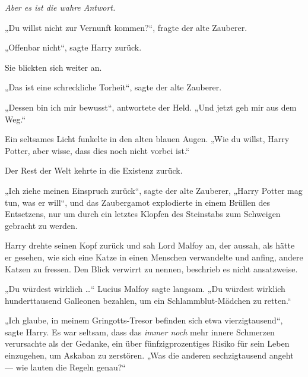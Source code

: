 \emph{Aber es ist die wahre Antwort.}

„Du willst nicht zur Vernunft kommen?“, fragte der alte Zauberer.

„Offenbar nicht“, sagte Harry zurück.

Sie blickten sich weiter an.

„Das ist eine schreckliche Torheit“, sagte der alte Zauberer.

„Dessen bin ich mir bewusst“, antwortete der Held.
„Und jetzt geh mir aus dem Weg.“

Ein seltsames Licht funkelte in den alten blauen Augen.
„Wie du willst, Harry Potter, aber wisse, dass dies noch nicht vorbei ist.“

Der Rest der Welt kehrte in die Existenz zurück.

„Ich ziehe meinen Einspruch zurück“, sagte der alte Zauberer,
„Harry Potter mag tun, was er will“, und das Zaubergamot explodierte in einem Brüllen des Entsetzens, nur um durch ein letztes Klopfen des Steinstabs zum Schweigen gebracht zu werden.

Harry drehte seinen Kopf zurück und sah Lord Malfoy an, der aussah, als hätte er gesehen, wie sich eine Katze in einen Menschen verwandelte und anfing, andere Katzen zu fressen. Den Blick verwirrt zu nennen, beschrieb es nicht ansatzweise.

„Du würdest wirklich …“ Lucius Malfoy sagte langsam.
„Du würdest wirklich hunderttausend Galleonen bezahlen, um ein Schlammblut-Mädchen zu retten.“

„Ich glaube, in meinem Gringotts-Tresor befinden sich etwa vierzigtausend“, sagte Harry. Es war seltsam, dass das \emph{immer noch} mehr innere Schmerzen verursachte als der Gedanke, ein über fünfzigprozentiges Risiko für sein Leben einzugehen, um Askaban zu zerstören.
„Was die anderen sechzigtausend angeht — wie lauten die Regeln genau?“

